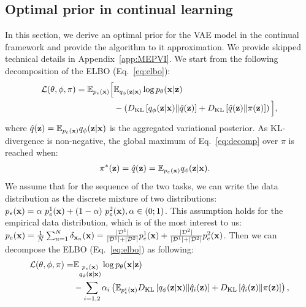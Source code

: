 \subsection{Optimal prior in continual learning} \label{sec:opt_prior}
In this section, we derive an optimal prior for the VAE model in the continual framework and provide the algorithm to it approximation. We provide skipped technical details in Appendix~\ref{app:MEPVI}. We start from the following decomposition of the ELBO (Eq.~\ref{eq:elbo}):
\begin{equation}
\label{eq:decomp}
\begin{aligned}
  \mathcal{L}(\theta, \phi, \pi) = \E_{p_{e}(\rvx)}\Big[&\E_{q_{\phi}(\rvz|\rvx)}\log p_{\theta}(\rvx|\rvz) \\
  &- \left(\KL{q_{\phi}(\rvz|\rvx)}{\hat{q}(\rvz)}+ \KL{\hat{q}(\rvz)}{\pi(\rvz)}\right)\Big],
\end{aligned}
\end{equation}
where $\hat{q}({\mathbf{z}})=\mathbb{E}_{p_{e}({\mathbf{x}})}q_{\phi}({\mathbf{z}}|{\mathbf{x}})$ is the aggregated variational posterior. As KL-divergence is non-negative, the global maximum of Eq.~\ref{eq:decomp} over $\pi$ is reached when:
\begin{equation}
\label{eq:opt_pr}
    \begin{aligned}
    & \pi^{*}(\rvz) = \hat{q}(\rvz)=\E_{p_{e}(\rvx)}q_{\phi}(\rvz|\rvx).
    \end{aligned}
\end{equation}
We assume that for the sequence of the two tasks, we can write the data distribution as the discrete mixture of two distributions: $p_{e}({\mathbf{x}})=\alpha~p_{e}^{1}({\mathbf{x}})+(1-\alpha)~p_{e}^{2}({\mathbf{x}}), \alpha\in(0;1)$. This assumption holds for the empirical data distribution, which is of the most interest to us: $p_{e}({\mathbf{x}})=\tfrac{1}{N}\sum_{n=1}^{N}\delta_{{\mathbf{x}}_n}({\mathbf{x}}) = \tfrac{|\mathcal{D}^1|}{|\mathcal{D}^1|+|\mathcal{D}^2|}p^{1}_{e}({\mathbf{x}}) + \tfrac{|\mathcal{D}^2|}{|\mathcal{D}^1|+|\mathcal{D}^2|}p^{2}_{e}({\mathbf{x}})$. 
Then we can decompose the ELBO (Eq.~\ref{eq:elbo}) as following:
\begin{equation}
\label{eq:big_decimpose}
\begin{aligned}
 \mathcal{L}(\theta, \phi, \pi) = & \E_{\substack{p_{e}(\rvx)\\
q_{\phi}(\rvz|\rvx)}}\log p_{\theta}(\rvx|\rvz) \\
&- \sum\limits_{i=1,2}\alpha_i\left( \E_{p^i_{e}(\rvx)} \KL{q_{\phi}(\rvz|\rvx)}{\hat{q}_{i}(\rvz)}+ \KL{\hat{q}_{i}(\rvz)}{\pi(\rvz)}\right), 
\end{aligned}
\end{equation}
